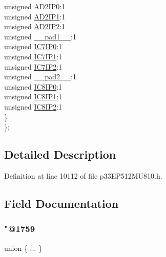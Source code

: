 \begin{DoxyCompactItemize}
\begin{tabbing}
\>\>unsigned \hyperlink{structtag_i_p_c5_b_i_t_s_a2b3f28946685ad237dd308e7aa3b9c80}{AD2IP0}:1\\
\>\>unsigned \hyperlink{structtag_i_p_c5_b_i_t_s_a58014a5e7d472e6149f515b1467372ca}{AD2IP1}:1\\
\>\>unsigned \hyperlink{structtag_i_p_c5_b_i_t_s_aa04847e2a708b23db8a55314510b7257}{AD2IP2}:1\\
\>\>unsigned \hyperlink{structtag_i_p_c5_b_i_t_s_acaf2d0924a107ec6e8d2e31febaf66f9}{\_\_pad1\_\_}:1\\
\>\>unsigned \hyperlink{structtag_i_p_c5_b_i_t_s_ac2f3cb39bafa2b1e3201237340fee20c}{IC7IP0}:1\\
\>\>unsigned \hyperlink{structtag_i_p_c5_b_i_t_s_a043ffb2c808898a4be58cef6716d1d04}{IC7IP1}:1\\
\>\>unsigned \hyperlink{structtag_i_p_c5_b_i_t_s_a5c8c59e05355f9a75825bff848ce2321}{IC7IP2}:1\\
\>\>unsigned \hyperlink{structtag_i_p_c5_b_i_t_s_a4d97cc5f7d51d22fc2bf3eab35c9cb7f}{\_\_pad2\_\_}:1\\
\>\>unsigned \hyperlink{structtag_i_p_c5_b_i_t_s_ad5ef7dc9806d3e3e54be0370a3839bfb}{IC8IP0}:1\\
\>\>unsigned \hyperlink{structtag_i_p_c5_b_i_t_s_aaee55aa4f091d92ebcbfc1348b8a2610}{IC8IP1}:1\\
\>\>unsigned \hyperlink{structtag_i_p_c5_b_i_t_s_ad04669fd6991269ec660f4b47cc93e2e}{IC8IP2}:1\\
\>\} \\
\}; \\

\end{tabbing}\end{DoxyCompactItemize}


\subsection{Detailed Description}


Definition at line 10112 of file p33\+E\+P512\+M\+U810.\+h.



\subsection{Field Documentation}
\mbox{\label{structtag_i_p_c5_b_i_t_s_af2f4b97ad1e3694a6b90c488c0ffaeff}} 
\subsubsection{\texorpdfstring{"@1759}{@1759}}
{\footnotesize\ttfamily union \{ ... \} }

